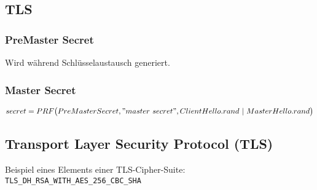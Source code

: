 \subsection{TLS}

\subsubsection{PreMaster Secret}
Wird während Schlüsselaustausch generiert.

\subsubsection{Master Secret}
\begin{equation}
	secret = PRF\big(PreMasterSecret,"master~secret", ClientHello.rand~|~MasterHello.rand\big)
\end{equation}


\subsection{Transport Layer Security Protocol (TLS)}
Beispiel eines Elements einer TLS-Cipher-Suite: \texttt{TLS\_DH\_RSA\_WITH\_AES\_256\_CBC\_SHA}
